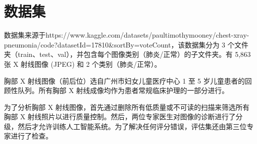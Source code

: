 \section{数据集}
数据集来源于https://www.kaggle.com/datasets/paultimothymooney/chest-xray-pneumonia/code?datasetId=17810\&sortBy=voteCount，该数据集分为 3 个文件夹（train、test、val），并包含每个图像类别（肺炎/正常）的子文件夹。有 5,863 张 X 射线图像 (JPEG) 和 2 个类别（肺炎/正常）。

胸部 X 射线图像（前后位）选自广州市妇女儿童医疗中心 1 至 5 岁儿童患者的回顾性队列。所有胸部 X 射线成像均作为患者常规临床护理的一部分进行。

为了分析胸部 X 射线图像，首先通过删除所有低质量或不可读的扫描来筛选所有胸部 X 射线照片以进行质量控制。然后，两位专家医生对图像的诊断进行了分级，然后才允许训练人工智能系统。为了解决任何评分错误，评估集还由第三位专家进行了检查。
